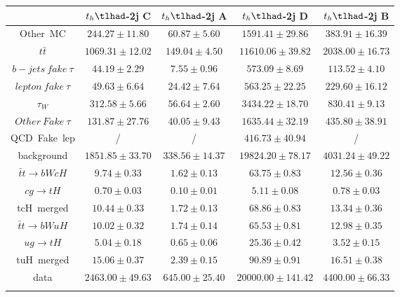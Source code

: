 \begin{tabular}{ccccc} \toprule\toprule
 & $t_{h}\tlhad$-2j C & $t_{h}\tlhad$-2j A & $t_{h}\tlhad$-2j D & $t_{h}\tlhad$-2j B\\\midrule
\hspace{3mm}Other~MC & $244.27\pm11.80$ & $60.87\pm5.60$ & $1591.41\pm29.86$ & $383.91\pm16.39$\\
\hspace{3mm}$t\bar{t}$ & $1069.31\pm12.02$ & $149.04\pm4.50$ & $11610.06\pm39.82$ & $2038.00\pm16.73$\\
\hspace{3mm}$b-jets~fake~\tau$ & $44.19\pm2.29$ & $7.55\pm0.96$ & $573.09\pm8.69$ & $113.52\pm4.10$\\
\hspace{3mm}$lepton~fake~\tau$ & $49.63\pm6.64$ & $24.42\pm7.64$ & $563.25\pm22.25$ & $229.60\pm16.12$\\
\hspace{3mm}$\tau_{W}$ & $312.58\pm5.66$ & $56.64\pm2.60$ & $3434.22\pm18.70$ & $830.41\pm9.13$\\
\hspace{3mm}$Other~Fake~\tau$ & $131.87\pm27.76$ & $40.05\pm9.43$ & $1635.44\pm32.19$ & $435.80\pm38.91$\\
\hspace{3mm}QCD~Fake~lep &  / &  / & $416.73\pm40.94$ &  /\\
background & $1851.85\pm33.70$ & $338.56\pm14.37$ & $19824.20\pm78.17$ & $4031.24\pm49.22$\\\midrule
\hspace{3mm}$\bar{t}t\to bWcH$ & $9.74\pm0.33$ & $1.62\pm0.13$ & $63.75\pm0.83$ & $12.56\pm0.36$\\
\hspace{3mm}$cg\to tH$ & $0.70\pm0.03$ & $0.10\pm0.01$ & $5.11\pm0.08$ & $0.78\pm0.03$\\
tcH~merged & $10.44\pm0.33$ & $1.72\pm0.13$ & $68.86\pm0.83$ & $13.34\pm0.36$\\
\hspace{3mm}$\bar{t}t\to bWuH$ & $10.02\pm0.32$ & $1.74\pm0.14$ & $65.53\pm0.81$ & $12.98\pm0.35$\\
\hspace{3mm}$ug\to tH$ & $5.04\pm0.18$ & $0.65\pm0.06$ & $25.36\pm0.42$ & $3.52\pm0.15$\\
tuH~merged & $15.06\pm0.37$ & $2.39\pm0.15$ & $90.89\pm0.91$ & $16.51\pm0.38$\\\midrule
data & $2463.00\pm49.63$ & $645.00\pm25.40$ & $20000.00\pm141.42$ & $4400.00\pm66.33$\\
\bottomrule\bottomrule\\
\end{tabular}
